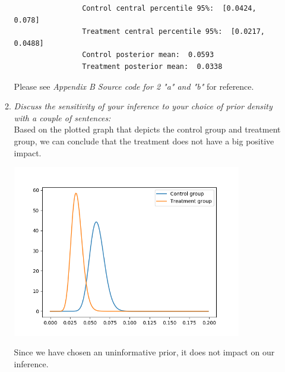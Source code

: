 \documentclass[11pt,a4paper,english]{article}
\begin{document}
\begin{enumerate}
\begin{enumerate}[label=\alph*.]
              \begin{verbatim}
                Control central percentile 95%:  [0.0424, 0.078]
                Treatment central percentile 95%:  [0.0217, 0.0488]
                Control posterior mean:  0.0593
                Treatment posterior mean:  0.0338
              \end{verbatim}
              Please see \textit{Appendix B  Source code for 2 "a" and "b"} for reference.

            \item \textit{Discuss the sensitivity of your inference to your choice
              of prior density with a couple of sentences:}\\
              Based on the plotted graph that depicts the control group and treatment group,
              we can conclude that the treatment does not have a big positive impact.

              \includegraphics[width=10cm]{3_2_a_control_beta.png}

              Since we have chosen an uninformative prior, it does not impact on our
              inference.
          \end{enumerate}
      \end{enumerate}
\end{document}
